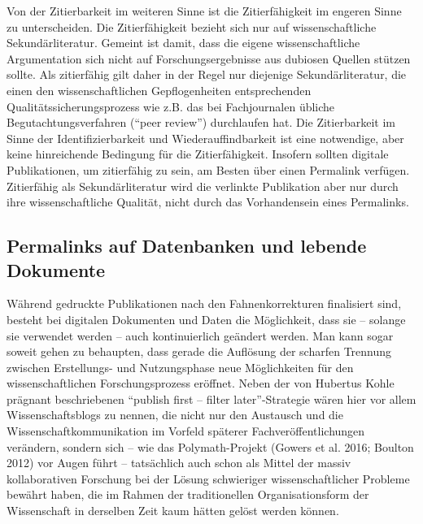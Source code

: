 \documentclass[12pt, a4paper]{article}
\begin{document}
Von der Zitierbarkeit im weiteren Sinne ist die Zitierfähigkeit im
engeren Sinne zu unterscheiden. Die Zitierfähigkeit bezieht sich nur
auf wissenschaftliche Sekundärliteratur. Gemeint ist damit, dass die
eigene wissenschaftliche Argumentation sich nicht auf
Forschungsergebnisse aus dubiosen Quellen stützen sollte. Als
zitierfähig gilt daher in der Regel nur diejenige Sekundärliteratur,
die einen den wissenschaftlichen Gepflogenheiten entsprechenden
Qualitätssicherungsprozess wie z.B. das bei Fachjournalen übliche
Begutachtungsverfahren ("`peer review"') durchlaufen hat. Die
Zitierbarkeit im Sinne der Identifizierbarkeit und
Wiederauffindbarkeit ist eine notwendige, aber keine hinreichende
Bedingung für die Zitierfähigkeit. Insofern sollten digitale
Publikationen, um zitierfähig zu sein, am Besten über einen Permalink
verfügen. Zitierfähig als Sekundärliteratur wird die verlinkte
Publikation aber nur durch ihre wissenschaftliche Qualität, nicht
durch das Vorhandensein eines Permalinks.

\subsection{Permalinks auf Datenbanken und lebende Dokumente}
\label{permalinks-auf-datenbanken-und-lebende-dokumente}

Während gedruckte Publikationen nach den Fahnenkorrekturen finalisiert
sind, besteht bei digitalen Dokumenten und Daten die Möglichkeit, dass
sie -- solange sie verwendet werden -- auch kontinuierlich
geändert werden. Man kann sogar soweit gehen zu behaupten, dass gerade
die Auflösung der scharfen Trennung zwischen Erstellungs- und
Nutzungsphase neue Möglichkeiten für den wissenschaftlichen
Forschungsprozess eröffnet. Neben der von Hubertus Kohle prägnant
beschriebenen "`publish first -- filter later"'-Strategie wären hier
vor allem Wissenschaftsblogs zu nennen, die nicht nur den Austausch
und die Wissenschaftkommunikation im Vorfeld späterer
Fachveröffentlichungen verändern, sondern sich -- wie das
Polymath-Projekt (Gowers et al.  2016; Boulton 2012) vor Augen führt
-- tatsächlich auch schon als Mittel der massiv kollaborativen
Forschung bei der Lösung schwieriger wissenschaftlicher Probleme
bewährt haben, die im Rahmen der traditionellen Organisationsform der
Wissenschaft in derselben Zeit kaum hätten gelöst werden können.
\end{document}
